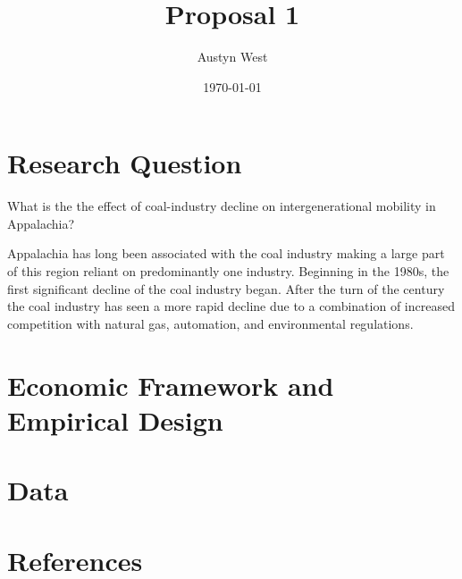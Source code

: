 \documentclass[12pt]{article}
\title{Proposal 1}
\author{Austyn West}
\date{\today}
\begin{document}
\maketitle


\section*{Research Question}
What is the the effect of coal-industry decline on intergenerational mobility in Appalachia?

Appalachia has long been associated with the coal industry making a large part of this region reliant 
on predominantly one industry. Beginning in the 1980s, the first significant decline of the coal industry began.
After the turn of the century the coal industry has seen a more rapid decline due to a combination of increased competition
with natural gas, automation, and environmental regulations. 

\section*{Economic Framework and Empirical Design}

\section*{Data}


\section*{References}
\end{document}

